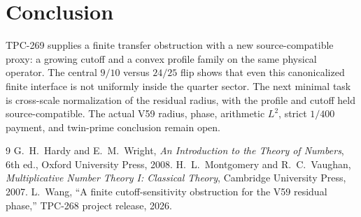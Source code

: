 \documentclass[11pt]{article}
\begin{document}
\section{Conclusion}
TPC-269 supplies a finite transfer obstruction with a new source-compatible
proxy: a growing cutoff and a convex profile family on the same physical
operator. The central $9/10$ versus $24/25$ flip shows that even this
canonicalized finite interface is not uniformly inside the quarter sector.
The next minimal task is cross-scale normalization of the residual radius, with
the profile and cutoff held source-compatible. The actual V59 radius, phase,
arithmetic $L^2$, strict $1/400$ payment, and twin-prime conclusion remain open.
\begin{thebibliography}{9}
 G.~H.~Hardy and E.~M.~Wright,
\emph{An Introduction to the Theory of Numbers}, 6th ed., Oxford University
Press, 2008.
 H.~L.~Montgomery and R.~C.~Vaughan,
\emph{Multiplicative Number Theory I: Classical Theory}, Cambridge University
Press, 2007.
 L.~Wang, ``A finite cutoff-sensitivity obstruction for the
V59 residual phase,'' TPC-268 project release, 2026.
\end{thebibliography}
\end{document}
